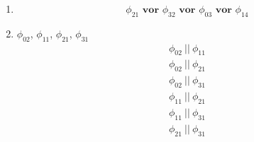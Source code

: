 \documentclass[a4paper]{scrartcl}
\begin{document}
\begin{enumerate}
    \item
        \begin{equation*}
            \phi_{21} \textbf{ vor } \phi_{32} \textbf{ vor } \phi_{03} \textbf{ vor } \phi_{14}
        \end{equation*}

    \item $\phi_{02}$, $\phi_{11}$, $\phi_{21}$, $\phi_{31}$
        \begin{gather*}
            \phi_{02} \ ||\  \phi_{11} \\
            \phi_{02} \ ||\  \phi_{21} \\
            \phi_{02} \ ||\  \phi_{31} \\
            \phi_{11} \ ||\  \phi_{21} \\
            \phi_{11} \ ||\  \phi_{31} \\
            \phi_{21} \ ||\  \phi_{31}
        \end{gather*}

\end{enumerate}
\end{document}
